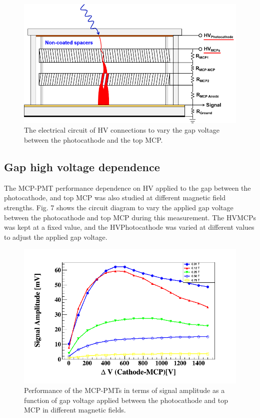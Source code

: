 \documentclass[preprint,5p]{elsarticle}
\begin{document}
\begin{figure}[tbp]
\centering \includegraphics[scale=0.98]{fig/pAQ3pS.png}
\caption{The electrical circuit of HV connections to vary the gap voltage 
   between the photocathode and the top MCP.} \label{fig:design}
\end{figure}

\subsection{Gap high voltage dependence} \label{}
The MCP-PMT performance dependence on HV applied to the gap between the 
photocathode, and top MCP was also studied at different magnetic field 
strengths. Fig. 7 shows the circuit diagram to vary the applied gap voltage 
between the photocathode and top MCP during this measurement. The HVMCPs was 
kept at a fixed value, and the HVPhotocathode was varied at different values to 
adjust the applied gap voltage. 

\begin{figure}[tbp]
\centering \includegraphics[scale=0.37]{fig/1uQ9Dn.png}
\caption{Performance of the MCP-PMTs in terms of signal amplitude as a function 
   of gap voltage applied between the photocathode and top MCP in different 
   magnetic fields.} \label{fig:design}
\end{figure} 
\end{document}
